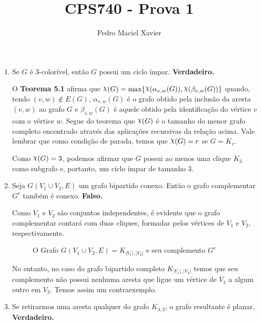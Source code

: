 \documentclass{homework}
\title{CPS740 - Prova 1}
\author{Pedro Maciel Xavier}
\begin{document}
	
	\maketitle
	
	\quest
	
	\begin{enumerate}[label=\textbf{\arabic*)}]
		\item Se $G$ é 3-colorível, então $G$ possui um ciclo ímpar. \textbf{Verdadeiro.} \par
		
		O \textbf{Teorema 5.1}\cite{jayme:18} afirma que $\rchi(G) = \max\{\rchi(\alpha_{v, w}(G)), \rchi(\beta_{v, w}(G))\}$ quando, tendo $(v, w) \notin E(G)$, $\alpha_{v, w}(G)$ é o grafo obtido pela inclusão da aresta $(v, w)$ ao grafo $G$ e $\beta_{v, w}(G)$ é aquele obtido pela identificação do vértice $v$ com o vértice $w$. Segue do teorema que $\rchi(G)$ é o tamanho do menor grafo completo encontrado através das aplicações recursivas da relação acima. Vale lembrar que como condição de parada, temos que $ \rchi(G) = r$ se $G = K_r$. \par
		
		Como $\rchi(G) = 3$, podemos afirmar que $G$ possui ao menos uma clique $K_3$ como subgrafo e, portanto, um ciclo ímpar de tamanho 3. \par
		
		\item Seja $G(V_1 \cup V_2, E)$ um grafo bipartido conexo. Então o grafo complementar $G^{c}$ também é conexo. \textbf{Falso.} \par
		
		Como $V_1$ e $V_2$ são conjuntos independentes, é evidente que o grafo complementar contará com duas cliques, formadas pelos vértices de $V_1$ e $V_2$, respectivamente. \par
		
		\begin{figure}[H]
			\centering
			
			\caption{O Grafo $G(V_1 \cup V_2, E) = K_{|V_1|, |V_2|}$ e seu complemento $G^{c}$}
			\label{fig:1.2.1}
		\end{figure}
		
		No entanto, no caso do grafo bipartido completo $K_{|V_1|, |V_2|}$ temos que seu complemento não possui nenhuma aresta que ligue um vértice de $V_1$ a algum outro em $V_2$. Temos assim um contraexemplo. \par
		
	\item Se retirarmos uma aresta qualquer do grafo $K_{3,3}$, o grafo resultante é planar. \textbf{Verdadeiro.} \par
	

\end{enumerate}
\end{document}

